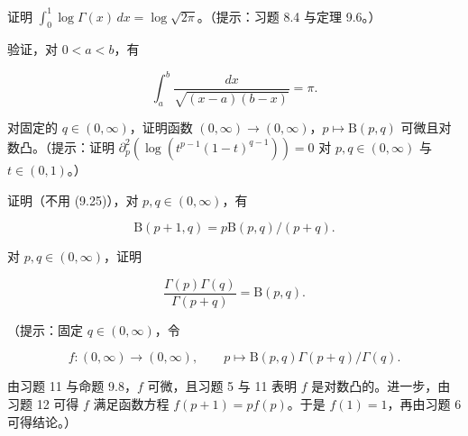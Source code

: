 \begin{exercises}
\item

证明 $ \int_{0}^{1}\log\Gamma(x) \, dx = \log\sqrt{2\pi} $。（提示：习题 8.4 与定理 9.6。）

\item

验证，对 $ 0 < a < b $，有

\[
\int_{a}^{b}\frac{dx}{\sqrt{(x-a)(b-x)}} = \pi .
\]
\item

对固定的 $ q \in (0,\infty) $，证明函数 $ (0,\infty) \to (0,\infty) $，$ p \mapsto \mathrm{B}(p,q) $ 可微且对数凸。（提示：证明 $ \partial_{p}^{2}(\log(t^{p-1}(1-t)^{q-1})) = 0 $ 对 $ p, q \in (0,\infty) $ 与 $ t \in (0,1) $。）

\item

证明（不用 (9.25)），对 $ p, q \in (0,\infty) $，有

\[
\mathrm{B}(p+1,q) = p\mathrm{B}(p,q)/(p+q) .
\]
\item

对 $ p, q \in (0,\infty) $，证明

\[
\frac{\Gamma(p)\Gamma(q)}{\Gamma(p+q)} = \mathrm{B}(p,q) .
\]

（提示：固定 $ q \in (0,\infty) $，令

\[
f : (0,\infty) \to (0,\infty) , \qquad p \mapsto \mathrm{B}(p,q)\Gamma(p+q)/\Gamma(q) .
\]

由习题 11 与命题 9.8，$ f $ 可微，且习题 5 与 11 表明 $ f $ 是对数凸的。进一步，由习题 12 可得 $ f $ 满足函数方程 $ f(p+1) = pf(p) $。于是 $ f(1) = 1 $，再由习题 6 可得结论。）

\end{exercises}
